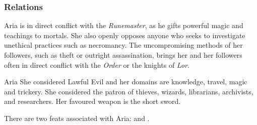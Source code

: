 \subsubsection*{Relations}

Aria is in direct conflict with the \emph{Runemaster}, as he gifts powerful
magic and teachings to mortals. She also openly opposes anyone who seeks to
investigate unethical practices such as necromancy. The uncompromising methods
of her followers, such as theft or outright assassination, brings her and her
followers often in direct conflict with the \emph{Order} or the knights of
\emph{Lor}.

\begin{35e}{Aria}
  She considered Lawful Evil and her domains are knowledge, travel, magic and
  trickery. She considered the patron of thieves, wizards, librarians,
  archivists, and researchers. Her favoured weapon is the short sword.

  There are two feats associated with Aria:  and
  .
\end{35e}
